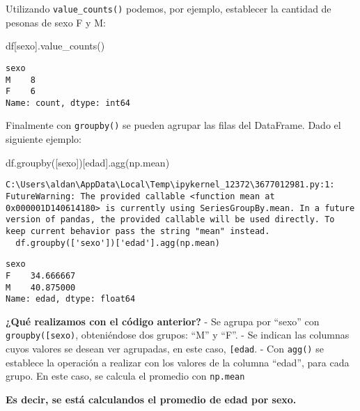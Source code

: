 \documentclass[
  letterpaper,
  DIV=11,
  numbers=noendperiod]{scrreprt}
\newenvironment{Shaded}{\begin{snugshade}}{\end{snugshade}}
\newcommand{\NormalTok}[1]{\textcolor[rgb]{0.00,0.23,0.31}{#1}}
\newcommand{\StringTok}[1]{\textcolor[rgb]{0.13,0.47,0.30}{#1}}
\begin{document}
Utilizando \texttt{value\_counts()} podemos, por ejemplo, establecer la
cantidad de pesonas de sexo F y M:

\begin{Shaded}
\begin{Highlighting}[]
\NormalTok{df[}\StringTok{\textquotesingle{}sexo\textquotesingle{}}\NormalTok{].value\_counts()}
\end{Highlighting}
\end{Shaded}

\begin{verbatim}
sexo
M    8
F    6
Name: count, dtype: int64
\end{verbatim}

Finalmente con \texttt{groupby()} se pueden agrupar las filas del
DataFrame. Dado el siguiente ejemplo:

\begin{Shaded}
\begin{Highlighting}[]
\NormalTok{df.groupby([}\StringTok{\textquotesingle{}sexo\textquotesingle{}}\NormalTok{])[}\StringTok{\textquotesingle{}edad\textquotesingle{}}\NormalTok{].agg(np.mean)}
\end{Highlighting}
\end{Shaded}

\begin{verbatim}
C:\Users\aldan\AppData\Local\Temp\ipykernel_12372\3677012981.py:1: FutureWarning: The provided callable <function mean at 0x000001D140614180> is currently using SeriesGroupBy.mean. In a future version of pandas, the provided callable will be used directly. To keep current behavior pass the string "mean" instead.
  df.groupby(['sexo'])['edad'].agg(np.mean)
\end{verbatim}

\begin{verbatim}
sexo
F    34.666667
M    40.875000
Name: edad, dtype: float64
\end{verbatim}

\textbf{¿Qué realizamos con el código anterior?} - Se agrupa por
``sexo'' con
\texttt{groupby({[}\textquotesingle{}sexo\textquotesingle{}{]})},
obteniéndose dos grupos: ``M'' y ``F''. - Se indican las columnas cuyos
valores se desean ver agrupadas, en este caso,
\texttt{{[}\textquotesingle{}edad\textquotesingle{}{]}}. - Con
\texttt{agg()} se establece la operación a realizar con los valores de
la columna ``edad'', para cada grupo. En este caso, se calcula el
promedio con \texttt{np.mean}

\textbf{Es decir, se está calculandos el promedio de edad por sexo.}
\end{document}
